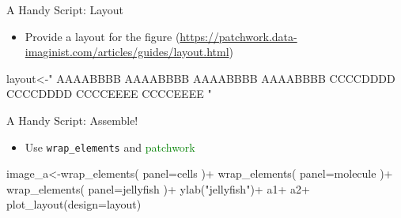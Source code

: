 \documentclass[
  ignorenonframetext,
]{beamer}
\newenvironment{Shaded}{\begin{snugshade}}{\end{snugshade}}
\newcommand{\AttributeTok}[1]{\textcolor[rgb]{0.40,0.45,0.13}{#1}}
\newcommand{\FunctionTok}[1]{\textcolor[rgb]{0.28,0.35,0.67}{#1}}
\newcommand{\NormalTok}[1]{\textcolor[rgb]{0.00,0.23,0.31}{#1}}
\newcommand{\OtherTok}[1]{\textcolor[rgb]{0.00,0.23,0.31}{#1}}
\newcommand{\SpecialCharTok}[1]{\textcolor[rgb]{0.37,0.37,0.37}{#1}}
\newcommand{\StringTok}[1]{\textcolor[rgb]{0.13,0.47,0.30}{#1}}
\providecommand{\tightlist}{%
  \setlength{\itemsep}{0pt}\setlength{\parskip}{0pt}}\usepackage{longtable,booktabs,array}
\begin{document}
\begin{frame}[fragile]{A Handy Script: Layout}
\protect\hypertarget{a-handy-script-layout}{}
\begin{itemize}[<+->]
\tightlist
\item
  Provide a layout for the figure
  (\url{https://patchwork.data-imaginist.com/articles/guides/layout.html})
\end{itemize}

\pause

\footnotesize

\begin{Shaded}
\begin{Highlighting}[]
\NormalTok{                        layout}\OtherTok{\textless{}{-}}\StringTok{"}
\StringTok{                        AAAABBBB}
\StringTok{                        AAAABBBB}
\StringTok{                        AAAABBBB}
\StringTok{                        AAAABBBB}
\StringTok{                        CCCCDDDD}
\StringTok{                        CCCCDDDD}
\StringTok{                        CCCCEEEE}
\StringTok{                        CCCCEEEE}
\StringTok{                        "}
\end{Highlighting}
\end{Shaded}
\end{frame}

\begin{frame}[fragile]{A Handy Script: Assemble!}
\protect\hypertarget{a-handy-script-assemble}{}
\begin{itemize}[<+->]
\tightlist
\item
  Use \texttt{wrap\_elements} and \textcolor{green}{{patchwork}}
\end{itemize}

\footnotesize

\begin{Shaded}
\begin{Highlighting}[]
\NormalTok{                image\_a}\OtherTok{\textless{}{-}}\FunctionTok{wrap\_elements}\NormalTok{(}
                    \AttributeTok{panel=}\NormalTok{cells}
\NormalTok{                )}\SpecialCharTok{+}
                    \FunctionTok{wrap\_elements}\NormalTok{(}
                        \AttributeTok{panel=}\NormalTok{molecule}
\NormalTok{                    )}\SpecialCharTok{+}
                    \FunctionTok{wrap\_elements}\NormalTok{(}
                        \AttributeTok{panel=}\NormalTok{jellyfish}
\NormalTok{                    )}\SpecialCharTok{+}
                    \FunctionTok{ylab}\NormalTok{(}\StringTok{"jellyfish"}\NormalTok{)}\SpecialCharTok{+}
\NormalTok{                    a1}\SpecialCharTok{+}
\NormalTok{                    a2}\SpecialCharTok{+}
                    \FunctionTok{plot\_layout}\NormalTok{(}\AttributeTok{design=}\NormalTok{layout)}
\end{Highlighting}
\end{Shaded}

\normalsize
\end{frame}
\end{document}
